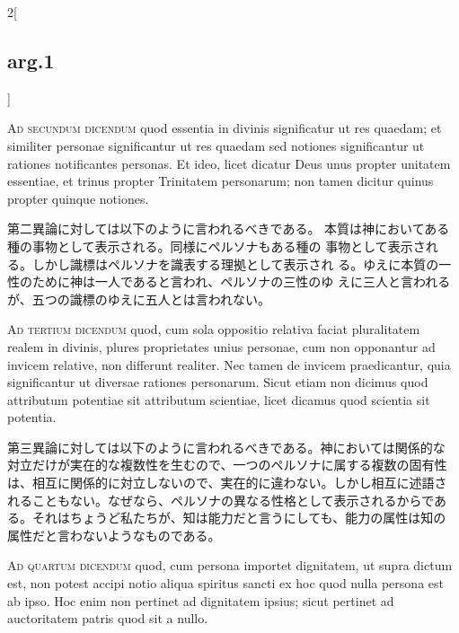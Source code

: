 \documentclass[paper=a4paper,fontsize=10pt,jafontsize=9pt,titlepage]{jlreq}
\begin{document}
\begin{paracol}{2}[\subsection{arg.1}]
\switchcolumn*[\subsection{ad.2}]

{\scshape Ad secundum dicendum} quod essentia in divinis significatur ut res
quaedam; et similiter personae significantur ut res quaedam sed
notiones significantur ut rationes notificantes personas. Et ideo,
licet dicatur Deus unus propter unitatem essentiae, et trinus propter
Trinitatem personarum; non tamen dicitur quinus propter quinque
notiones.

\switchcolumn

第二異論に対しては以下のように言われるべきである。
本質は神においてある種の事物として表示される。同様にペルソナもある種の
事物として表示される。しかし識標はペルソナを識表する理拠として表示され
る。ゆえに本質の一性のために神は一人であると言われ、ペルソナの三性のゆ
えに三人と言われるが、五つの識標のゆえに五人とは言われない。

\switchcolumn*[\subsection{ad.3}]

{\scshape Ad tertium dicendum} quod, cum sola oppositio relativa faciat
pluralitatem realem in divinis, plures proprietates unius personae,
cum non opponantur ad invicem relative, non differunt realiter. Nec
tamen de invicem praedicantur, quia significantur ut diversae rationes
personarum. Sicut etiam non dicimus quod attributum potentiae sit
attributum scientiae, licet dicamus quod scientia sit potentia.

\switchcolumn

第三異論に対しては以下のように言われるべきである。神においては関係的な
対立だけが実在的な複数性を生むので、一つのペルソナに属する複数の固有性
は、相互に関係的に対立しないので、実在的に違わない。しかし相互に述語さ
れることもない。なぜなら、ペルソナの異なる性格として表示されるからであ
る。それはちょうど私たちが、知は能力だと言うにしても、能力の属性は知の
属性だと言わないようなものである。

\switchcolumn*[\subsection{ad.4}]

{\scshape Ad quartum dicendum} quod, cum persona importet dignitatem, ut supra
dictum est, non potest accipi notio aliqua spiritus sancti ex hoc quod
nulla persona est ab ipso. Hoc enim non pertinet ad dignitatem ipsius;
sicut pertinet ad auctoritatem patris quod sit a nullo.


\end{paracol}
\end{document}
